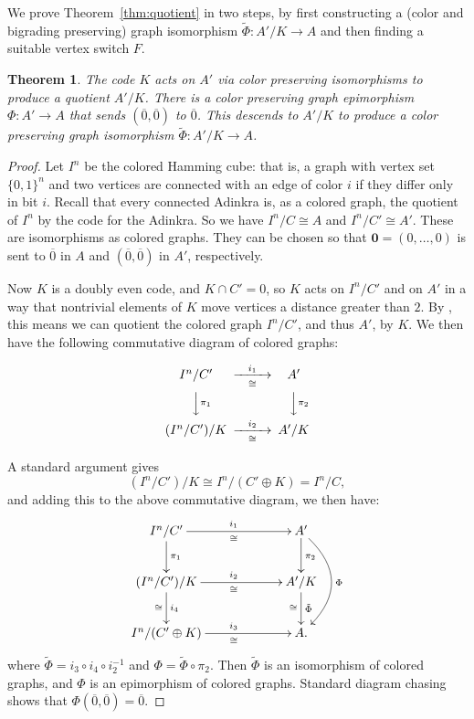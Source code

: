 \documentclass[12pt,twoside,singlespace]{article}
\numberwithin{equation}{section}
\newtheorem{thm}[equation]{Theorem}
\theoremstyle{definition}
\renewcommand{\vec}[1]{\mathbf{#1}}
\begin{document}
We prove Theorem~\ref{thm:quotient} in two steps, by first constructing a (color and bigrading preserving) graph isomorphism $\tilde{\Phi}:A'/K\to A$ and then finding a suitable vertex switch $F$.

\begin{thm}
\label{thm:isocolors}
The code $K$ acts on $A'$ via color preserving isomorphisms to produce a quotient $A'/K$.  There is a color preserving graph epimorphism $\Phi:A' \to A$ that sends $(\overline{0},\overline{0})$ to $\overline{0}$.  This descends to $A'/K$ to produce a color preserving graph isomorphism $\tilde{\Phi}:A'/K\to A$.
\end{thm}
\begin{proof}
Let $I^n$ be the colored Hamming cube: that is, a graph with vertex set $\{0,1\}^n$ and two vertices are connected with an edge of color $i$ if they differ only in bit $i$.  Recall that every connected Adinkra is, as a colored graph, the quotient of $I^n$ by the code for the Adinkra.\cite{d2l:omni}  So we have $I^n/C \cong A$ and $I^n/C'\cong A'$. These are isomorphisms as colored graphs.  They can be chosen so that $\vec{0}=(0,\ldots,0)$ is sent to $\overline{0}$ in $A$ and $(\overline{0},\overline{0})$ in $A'$, respectively.

Now $K$ is a doubly even code, and $K\cap C'=0$, so $K$ acts on $I^n/C'$ and on $A'$ in a way that nontrivial elements of $K$ move vertices a distance greater than $2$.  By \cite{zhang:adinkras}, this means we can quotient the colored graph $I^n/C'$, and thus $A'$, by $K$.  We then have the following commutative diagram of colored graphs:

\[
\begin{CD}
I^n/C' @>i_1>\cong> A'\\
@VV\pi_1 V @VV\pi_2 V\\
(I^n/C')/K @>i_2>\cong> A'/K\\
\end{CD}  
\]

A standard argument gives
\[(I^n/C')/K \cong I^n/(C'\oplus K)=I^n/C,\]
and adding this to the above commutative diagram, we then have:
\[
\xymatrixcolsep{5pc}
\xymatrix{
I^n/C' \ar[d]^{\pi_1} \ar[r]^{i_1}_{\cong} &A'\ar[d]^{\pi_2}\ar@/^2pc/[dd]^{\Phi} \\
(I^n/C')/K \ar[d]^{i_4}_{\cong} \ar[r]^{i_2}_\cong &A'/K\ar[d]_{\cong}^{\tilde{\Phi}}\\
I^n/(C'\oplus K) \ar[r]^{i_3}_\cong &A.}
\]
where $\tilde{\Phi}=i_3\circ i_4\circ i_2^{-1}$ and $\Phi=\tilde{\Phi}\circ \pi_2$.  Then $\tilde{\Phi}$ is an isomorphism of colored graphs, and $\Phi$ is an epimorphism of colored graphs.  Standard diagram chasing shows that $\Phi(\overline{0},\overline{0})=\overline{0}$.
\end{proof}
\end{document}
